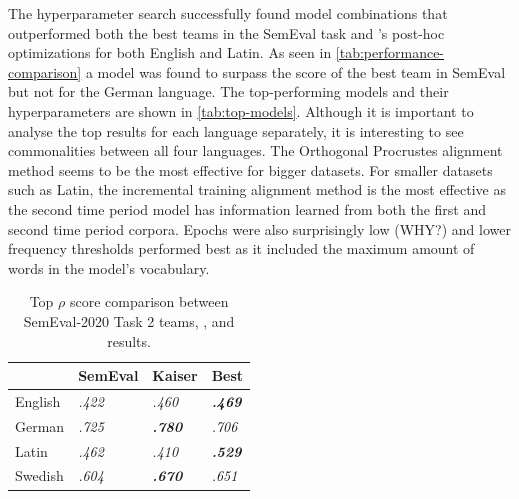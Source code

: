 The hyperparameter search successfully found model combinations that outperformed both the best teams in the SemEval task and \citet{kaiser-etal-2020-ims}’s post-hoc optimizations for both English and Latin. As seen in \autoref{tab:performance-comparison} a model was found to surpass the score of the best team in SemEval but not \citet{kaiser-etal-2020-ims} for the German language. The top-performing models and their hyperparameters are shown in \autoref{tab:top-models}. Although it is important to analyse the top results for each language separately, it is interesting to see commonalities between all four languages. The Orthogonal Procrustes alignment method seems to be the most effective for bigger datasets. For smaller datasets such as Latin, the incremental training alignment method is the most effective as the second time period model has information learned from both the first and second time period corpora. Epochs were also surprisingly low (WHY?) and lower frequency thresholds performed best as it included the maximum amount of words in the model’s vocabulary. 

\begin{table}[h]
\centering
\begin{tabular}{|l|l|l|l|} 
\cline{2-4}
\multicolumn{1}{l|}{\textbf{ }} & SemEval         & Kaiser                   & Best                      \\ 
\hline
English                         & \textit{ .422 } & \textit{ .460 }          & \textbf{\textit{ .469 }}  \\ 
\hline
German                          & \textit{ .725 } & \textit{\textbf{ .780 }} & \textit{ .706 }           \\ 
\hline
Latin                           & \textit{ .462 } & \textit{ .410 }          & \textbf{\textit{ .529 }}  \\ 
\hline
Swedish                         & \textit{ .604 } & \textit{\textbf{ .670 }} & \textit{ .651 }           \\
\hline
\end{tabular}
\caption{Top $\rho$ score comparison between SemEval-2020 Task 2 teams, \citet{kaiser-etal-2020-ims}, and results.}
\label{tab:performance-comparison}
\end{table}


